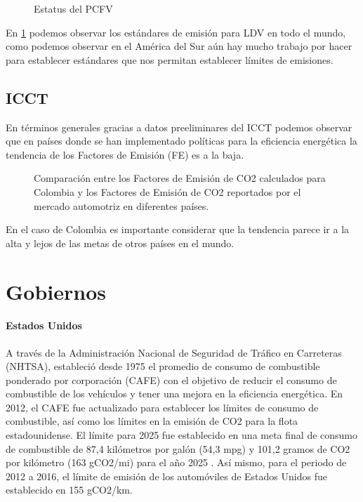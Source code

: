  \begin{figure}[htbp]
   \centering
   
    \caption{Estatus del PCFV \cite{Vehicles_PCFV}}
    \label{fig:statuslatam-PCFV}
\end{figure}

En \ref{fig:statuslatam-PCFV} podemos observar los estándares de emisión para LDV en todo el mundo, como podemos observar en el América del Sur aún hay mucho trabajo por hacer para establecer estándares que nos permitan establecer límites de emisiones.

\subsection{ICCT}

En términos generales gracias a datos preeliminares del ICCT podemos observar que en países donde se han implementado políticas para la eficiencia energética la tendencia de los Factores de Emisión (FE) es a la baja.

\begin{figure}[htbp]
   \centering
   
    \caption{Comparación entre los Factores de Emisión de CO2 calculados para Colombia y los Factores de Emisión de CO2 reportados por el mercado automotriz en diferentes países. \cite{ICCT_Performance_2020}}
    \label{fig:linebaseclase}
\end{figure}

En el caso de Colombia es importante considerar que la tendencia parece ir a la alta y lejos de las metas de otros países en el mundo.

\section{Gobiernos}


\paragraph{Estados Unidos} A través de la Administración Nacional de Seguridad de Tráfico en Carreteras (NHTSA), estableció desde 1975 el promedio de consumo de combustible ponderado por corporación (CAFE) con el objetivo de reducir el consumo de combustible de los vehículos y tener una mejora en la eficiencia energética. En 2012, el CAFE fue actualizado para establecer los límites de consumo de combustible, así como los límites en la emisión de CO2 para la flota estadounidense. El límite para 2025 fue establecido en una meta final de consumo de combustible de 87,4 kilómetros por galón (54,3 mpg) y 101,2 gramos de CO2 por kilómetro (163 gCO2/mi) para el año 2025 \cite{EPA_2012-B}. Así mismo, para el periodo de 2012 a 2016, el límite de emisión de los automóviles de Estados Unidos fue establecido en 155 gCO2/km. \cite{InformeFinal_WRI}

